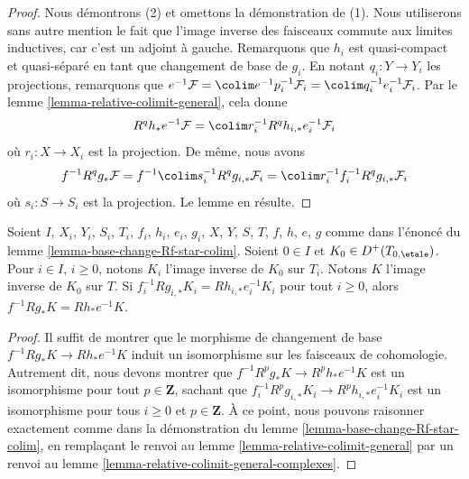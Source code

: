 \begin{proof}
Nous démontrons (2) et omettons la démonstration de (1). Nous utiliserons sans
autre mention le fait que l'image inverse des faisceaux commute aux limites inductives,
car c'est un adjoint à gauche. Remarquons que $h_i$ est quasi-compact et quasi-séparé en tant que
changement de base de $g_i$.
En notant $q_i : Y \to Y_i$ les projections, remarquons que
$e^{-1}\mathcal{F} = \colim e^{-1}p_i^{-1}\mathcal{F}_i =
\colim q_i^{-1}e_i^{-1}\mathcal{F}_i$.
Par le lemme \ref{lemma-relative-colimit-general},
cela donne
$$
R^qh_*e^{-1}\mathcal{F} = \colim r_i^{-1}R^qh_{i, *}e_i^{-1}\mathcal{F}_i
$$
où $r_i : X \to X_i$ est la projection.
De même, nous avons
$$
f^{-1}R^qg_*\mathcal{F} =
f^{-1}\colim s_i^{-1}R^qg_{i, *}\mathcal{F}_i =
\colim r_i^{-1}f_i^{-1}R^qg_{i, *}\mathcal{F}_i
$$
où $s_i : S \to S_i$ est la projection. Le lemme en résulte.
\end{proof}

\begin{lemma}
\label{lemma-base-change-Rf-star-colim-complexes}
Soient $I$, $X_i$, $Y_i$, $S_i$, $T_i$, $f_i$, $h_i$, $e_i$, $g_i$,
$X$, $Y$, $S$, $T$, $f$, $h$, $e$, $g$ comme dans l'énoncé
du lemme \ref{lemma-base-change-Rf-star-colim}.
Soient $0 \in I$ et $K_0 \in D^+(T_{0, \etale})$.
Pour $i \in I$, $i \geq 0$, notons $K_i$ l'image inverse de
$K_0$ sur $T_i$. Notons $K$ l'image inverse de $K_0$ sur $T$.
Si $f_i^{-1}Rg_{i, *}K_i = Rh_{i, *}e_i^{-1}K_i$
pour tout $i \geq 0$, alors $f^{-1}Rg_*K = Rh_*e^{-1}K$.
\end{lemma}

\begin{proof}
Il suffit de montrer que le morphisme de changement de base
$f^{-1}Rg_*K \to Rh_*e^{-1}K$ induit un isomorphisme
sur les faisceaux de cohomologie. Autrement dit, nous devons montrer
que $f^{-1}R^pg_*K \to R^ph_*e^{-1}K$ est un isomorphisme
pour tout $p \in \mathbf{Z}$, sachant que
$f_i^{-1}R^pg_{i, *}K_i \to R^ph_{i, *}e_i^{-1}K_i$
est un isomorphisme pour tous $i \geq 0$ et $p \in \mathbf{Z}$.
À ce point, nous pouvons raisonner exactement comme dans la démonstration du
lemme \ref{lemma-base-change-Rf-star-colim},
en remplaçant le renvoi au
lemme \ref{lemma-relative-colimit-general}
par un renvoi au
lemme \ref{lemma-relative-colimit-general-complexes}.
\end{proof}

